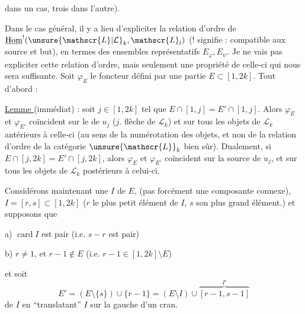 dans un cas, trois dans l'autre).

Dans le cas général, il y a lieu d'expliciter
la relation d'ordre de   $\underline{\mathrm{Hom}}^{!}(\unsure{\mathscr{L}|\mathcal{L}}_k,\mathscr{L}_l)$
($!$ signifie : compatible aux source et but), en termes
des  ensembles représentatifs $E_\varphi,E_\psi$.
Je ne vais pas expliciter cette relation d'ordre, mais
seulement une propriété de celle-ci qui nous sera
suffisante.  Soit $\varphi_E$ le foncteur défini
par une partie $E\subset[1,2k]$. Tout d'abord :

\uline{Lemme } (immédiat) :  soit $j\in[1,2k]$ tel que
$E\cap[1,j]=E'\cap[1,j]$. Alors $\varphi_E$ et $\varphi_{E'}$ coïncident sur 
le   de $u_j$ ($j$. flèche de $\mathscr{L}_k$) et sur
tous les objets de $\mathscr{L}_k$  antérieurs à celle-ci
(au sens de la numérotation des objets, et non de la
relation d'ordre de la catégorie $\unsure{\mathscr{L}}_k$ bien sûr). Dualement,
si $E\cap[j,2k]=E'\cap[j,2k]$, alors $\varphi_E$ et $\varphi_{E'}$ coïncident
sur la source de $u_j$, et sur tous les objets de $\mathscr{L}_k$ postérieurs
à celui-ci.

Considérons maintenant une  
$I$ de $E$,  (pas forcément une composante
connexe),  $I=[r,s]\subset[1,2k]$ ($r$ le plus petit élément de $I$,
$s$ son  plus grand élément.) et supposons que

a) $\operatorname{card}I$ est pair (i.e. $s-r$ est pair)

b) $r\ne1$, et $r-1\notin E$ (i.e. $r-1\in[1,2k]\setminus E$)

et soit 
\[
E'=(E\setminus\{s\})\cup\{r-1\}=(E\setminus I)\cup\overbrace{[r-1,s-1]}^{I'}
\]
 de $I$ en ``translatant'' $I$ sur la gauche d'un cran.

